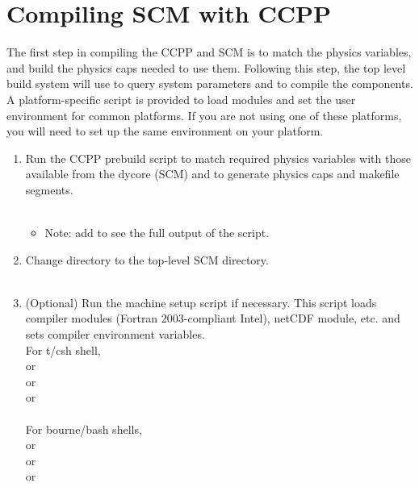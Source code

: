 \section{Compiling SCM with CCPP}
\label{section: compiling}

The first step in compiling the CCPP and SCM is to match the physics variables, and build the physics caps needed to use them.  Following this step, the top level build system will use  to query system parameters and  to compile the components.  A platform-specific script is provided to load modules and set the user environment for common platforms.  If you are not using one of these platforms, you will need to set up the same environment on your platform.

\begin{enumerate}
	\item Run the CCPP prebuild script to match required physics variables with those available from the dycore (SCM) and to generate physics caps and makefile segments.\\
  		\\
  		\begin{itemize}
  			\item Note: add  to see the full output of the script.\\
		\end{itemize}

	\item Change directory to the top-level SCM directory.\\
  		 \\
	\item (Optional) Run the machine setup script if necessary. This script loads compiler modules (Fortran 2003-compliant Intel), netCDF module, etc. and sets compiler environment variables.  \\
For t/csh shell, \\
  		 or\\
 		 or\\
		 or\\
		\\

For bourne/bash shells,\\
   or\\
   or\\
   or\\
  \\
  

\end{enumerate}
